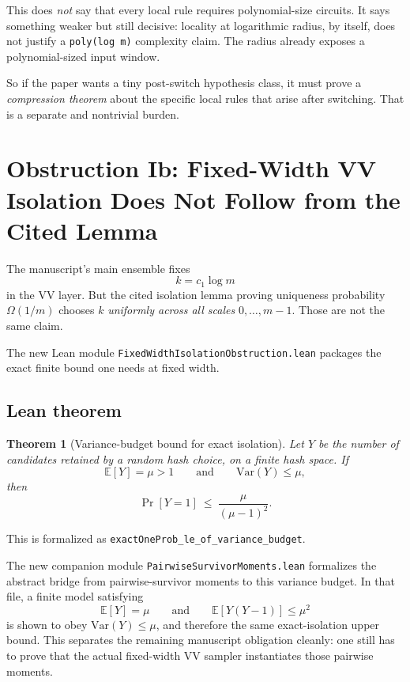 \documentclass[11pt]{article}
\newtheorem{theorem}{Theorem}[section]
\theoremstyle{remark}
\begin{document}
This does \emph{not} say that every local rule requires polynomial-size circuits.
It says something weaker but still decisive: locality at logarithmic radius, by itself, does not
justify a \texttt{poly(log m)} complexity claim.  The radius already exposes a polynomial-sized
input window.

So if the paper wants a tiny post-switch hypothesis class, it must prove a \emph{compression
theorem} about the specific local rules that arise after switching.  That is a separate and
nontrivial burden.

\section{Obstruction Ib: Fixed-Width VV Isolation Does Not Follow from the Cited Lemma}

The manuscript's main ensemble fixes
\[
  k=c_1\log m
\]
in the VV layer.  But the cited isolation lemma proving uniqueness probability \(\Omega(1/m)\)
chooses \(k\) \emph{uniformly across all scales} \(0,\dots,m-1\).  Those are not the same claim.

The new Lean module \texttt{FixedWidthIsolationObstruction.lean} packages the exact finite bound
one needs at fixed width.

\subsection{Lean theorem}

\begin{theorem}[Variance-budget bound for exact isolation]
Let \(Y\) be the number of candidates retained by a random hash choice, on a finite hash space.
If
\[
  \mathbb E[Y]=\mu>1
  \qquad\text{and}\qquad
  \mathrm{Var}(Y)\le \mu,
\]
then
\[
  \Pr[Y=1]\ \le\ \frac{\mu}{(\mu-1)^2}.
\]
\end{theorem}

\noindent
This is formalized as
\texttt{exactOneProb\_le\_of\_variance\_budget}.

The new companion module \texttt{PairwiseSurvivorMoments.lean} formalizes the abstract bridge from
pairwise-survivor moments to this variance budget.  In that file, a finite model satisfying
\[
  \mathbb E[Y]=\mu
  \qquad\text{and}\qquad
  \mathbb E[Y(Y-1)]\le \mu^2
\]
is shown to obey \(\mathrm{Var}(Y)\le \mu\), and therefore the same exact-isolation upper bound.
This separates the remaining manuscript obligation cleanly: one still has to prove that the actual
fixed-width VV sampler instantiates those pairwise moments.
\end{document}
